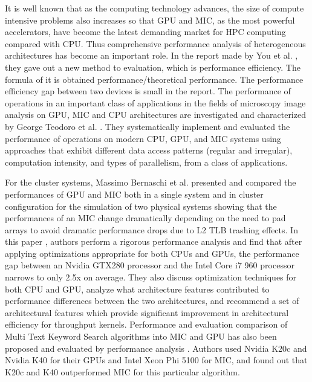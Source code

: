   \vspace{-1mm} 
It is well known that as the computing technology advances, the size of compute intensive problems also increases so that GPU and MIC, as the most powerful accelerators, have become the latest demanding market for HPC computing compared with CPU. Thus comprehensive performance analysis of heterogeneous architectures has become an important role. In the report made by You et al. \cite{R:8}, they gave out a new method to evaluation, which is performance efficiency. The formula of it is obtained performance/theoretical performance. The performance efficiency gap between two devices is small in the report. The performance of operations in an important class of applications in the fields of microscopy image analysis on GPU, MIC and CPU architectures are investigated and characterized by George Teodoro et al. \cite{R:9}. They systematically implement and evaluated the performance of operations on modern CPU, GPU, and MIC systems using approaches that exhibit different data access patterns (regular and irregular), computation intensity, and types of parallelism, from a class of applications. 

For the cluster systems, Massimo Bernaschi et al. \cite{R:10} presented and compared the performances of GPU and MIC both in a single system and in cluster configuration for the simulation of two physical systems showing that the performances of an MIC change dramatically depending on the need to pad arrays to avoid dramatic performance drops due to L2 TLB trashing effects. In this paper \cite{R:11}, authors perform a rigorous performance analysis and find that after applying optimizations appropriate for both CPUs and GPUs, the performance gap between an Nvidia GTX280 processor and the Intel Core i7 960 processor narrows to only 2.5x on average. They also discuss optimization techniques for both CPU and GPU, analyze what architecture features contributed to performance differences between the two architectures, and recommend a set of architectural features which provide significant improvement in architectural efficiency for throughput kernels. Performance and evaluation comparison of Multi Text Keyword Search algorithms into MIC and GPU has also been proposed and evaluated by performance analysis \cite{R:12}. Authors used Nvidia K20c and Nvidia K40 for their GPUs and Intel Xeon Phi 5100 for MIC, and found out that K20c and K40 outperformed MIC for this particular algorithm. 

